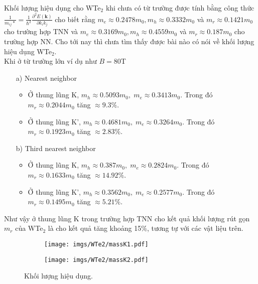 \documentclass{article}
\begin{document}
Khối lượng hiệu dụng cho WTe$_{2}$ khi chưa có từ trường được tính bằng công thức $\frac{1}{m_{ij}*} =\frac{1}{\hbar^{2}} \frac{\partial^{2} E(\mathbf{k})}{\partial k_{i} k_{j}}$ cho biết rằng $m_{e} \approx 0.2478 m_{0}, m_{h} \approx 0.3332 m_{0}$ và $m_{r} \approx 0.1421 m_{0}$ cho trường hợp TNN và $m_{e} \approx 0.3169 m_{0}, m_{h} \approx 0.4559 m_{0}$ và $m_{r} \approx 0.187 m_{0}$ cho trường hợp NN. Cho tới nay thì chưa tìm thấy được bài nào có nói về khối lượng hiệu dụng WTe$_{2}$. \\
Khi ở từ trường lớn ví dụ như $B = 80 $T
\begin{itemize}
	\item[a)] Nearest neighbor
	\begin{itemize}
		\item Ở thung lũng K, $m_{h} \approx 0.5093 m_{0},\; m_{e} \approx 0.3413 m_{0}$. 
		Trong đó $m_{r} \approx 0.2044 m_{0}$ tăng $\approx 9.3\%$.
		
		\item Ở thung lũng K', $m_{h} \approx 0.4681 m_{0},\; m_{e} \approx 0.3264 m_{0}$. 
		Trong đó $m_{r} \approx 0.1923 m_{0}$ tăng $\approx 2.83\%$.
	\end{itemize}
	\item[b)] Third nearest neighbor
	\begin{itemize}
		\item Ở thung lũng K, $m_{h} \approx 0.387 m_{0},\; m_{e} \approx 0.2824 m_{0}$. 
		Trong đó $m_{r} \approx 0.1633 m_{0}$ tăng $\approx 14.92\%$.
		
		\item Ở thung lũng K', $m_{h} \approx 0.3562 m_{0},\; m_{e} \approx 0.2577 m_{0}$. 
		Trong đó $m_{r} \approx 0.1495 m_{0}$ tăng $\approx 5.21\%$.
	\end{itemize}
\end{itemize}
Như vậy ở thung lũng K trong trường hợp TNN cho kết quả khối lượng rút gọn $m_r$ của WTe$_{2}$ là cho kết quả tăng khoảng 15\%, tương tự với các vật liệu trên.
\begin{figure}[htb]
	\begin{subfigure}{0.495\textwidth}
		\centering
		\texttt{[image: imgs/WTe2/massK1.pdf]}
	\end{subfigure}
	\begin{subfigure}{0.495\textwidth}
		\centering
		\texttt{[image: imgs/WTe2/massK2.pdf]}
	\end{subfigure}
	\caption{Khối lượng hiệu dụng.}
\end{figure}

\newpage



\end{document}
